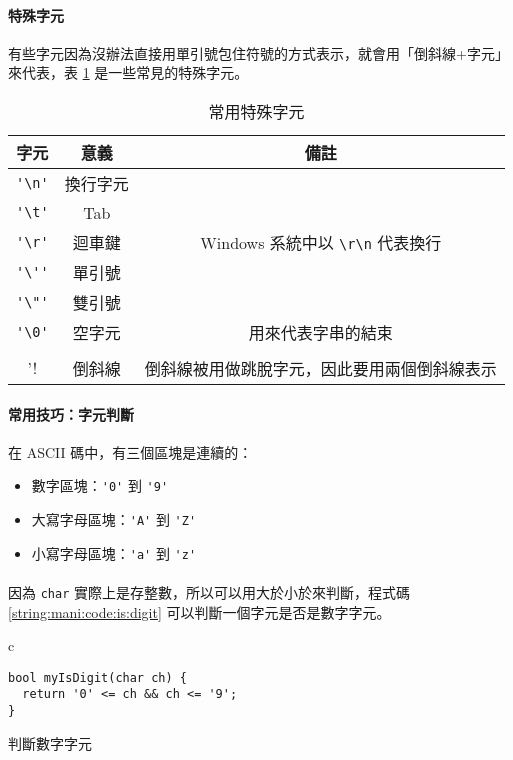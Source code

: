 \documentclass[12pt,a4paper,oneside]{article}
\begin{document}
\begin{CJK}{UTF8}{bkai}
\paragraph{特殊字元}有些字元因為沒辦法直接用單引號包住符號的方式表示，就會用「倒斜線+字元」來代表，表 \ref{string:mani:table:char:special} 是一些常見的特殊字元。

\begin{table}[h!]
  \centering
  \begin{tabular}{|c|c|c|}
  \hline
  \textbf{字元} & \textbf{意義} & \textbf{備註}\\
  \hline\hline
  \lstinline!'\n'! & 換行字元 &\\
  \hline
  \lstinline!'\t'! & Tab &\\
  \hline
  \lstinline!'\r'! & 迴車鍵 & Windows 系統中以 \lstinline!\r\n! 代表換行\\
  \hline
  \lstinline!'\''! & 單引號 &\\
  \hline
  \lstinline!'\"'! & 雙引號 &\\
  \hline
  \lstinline!'\0'! & 空字元 & 用來代表字串的結束\\
  \hline
  \lstinline!'\\'! & 倒斜線 & 倒斜線被用做跳脫字元，因此要用兩個倒斜線表示\\
  \hline
  \end{tabular}
  \caption{常用特殊字元}
  \label{string:mani:table:char:special}
\end{table}

\paragraph{常用技巧：字元判斷}在 ASCII 碼中，有三個區塊是連續的：
\begin{itemize}
\item 數字區塊：\lstinline!'0'! 到 \lstinline!'9'!
\item 大寫字母區塊：\lstinline!'A'! 到 \lstinline!'Z'!
\item 小寫字母區塊：\lstinline!'a'! 到 \lstinline!'z'!
\end{itemize}

\paragraph{}因為 \lstinline!char! 實際上是存整數，所以可以用大於小於來判斷，程式碼 \ref{string:mani:code:is:digit} 可以判斷一個字元是否是數字字元。
\begin{code}[h!]
  \centering
  \begin{tabular}{c}
  \begin{lstlisting}
bool myIsDigit(char ch) {
  return '0' <= ch && ch <= '9';
}
  \end{lstlisting}
  \end{tabular}
  \caption{判斷數字字元}
  \label{string:mani:code:is:digit}
\end{code}


\end{CJK}
\end{document}

